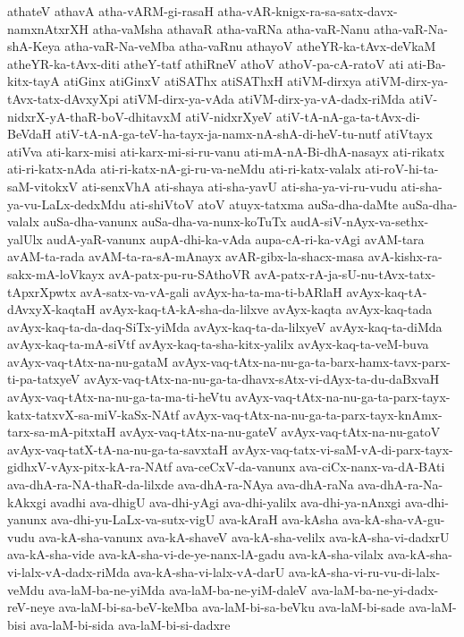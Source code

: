 {athateV
athavA
atha-vARM-gi-rasaH
atha-vAR-knigx-ra-sa-satx-davx-namxnAtxrXH
atha-vaMsha
athavaR
atha-vaRNa
atha-vaR-Nanu
atha-vaR-Na-shA-Keya
atha-vaR-Na-veMba
atha-vaRnu
athayoV
atheYR-ka-tAvx-deVkaM
atheYR-ka-tAvx-diti
atheY-tatf
athiRneV
athoV
athoV-pa-cA-ratoV
ati
ati-Ba-kitx-tayA
atiGinx
atiGinxV
atiSAThx
atiSAThxH
atiVM-dirxya
atiVM-dirx-ya-tAvx-tatx-dAvxyXpi
atiVM-dirx-ya-vAda
atiVM-dirx-ya-vA-dadx-riMda
atiV-nidxrX-yA-thaR-boV-dhitavxM
atiV-nidxrXyeV
atiV-tA-nA-ga-ta-tAvx-di-BeVdaH
atiV-tA-nA-ga-teV-ha-tayx-ja-namx-nA-shA-di-heV-tu-nutf
atiVtayx
atiVva
ati-karx-misi
ati-karx-mi-si-ru-vanu
ati-mA-nA-Bi-dhA-nasayx
ati-rikatx
ati-ri-katx-nAda
ati-ri-katx-nA-gi-ru-va-neMdu
ati-ri-katx-valalx
ati-roV-hi-ta-saM-vitokxV
ati-senxVhA
ati-shaya
ati-sha-yavU
ati-sha-ya-vi-ru-vudu
ati-sha-ya-vu-LaLx-dedxMdu
ati-shiVtoV
atoV
atuyx-tatxma
auSa-dha-daMte
auSa-dha-valalx
auSa-dha-vanunx
auSa-dha-va-nunx-koTuTx
audA-siV-nAyx-va-sethx-yalUlx
audA-yaR-vanunx
aupA-dhi-ka-vAda
aupa-cA-ri-ka-vAgi
avAM-tara
avAM-ta-rada
avAM-ta-ra-sA-mAnayx
avAR-gibx-la-shacx-masa
avA-kishx-ra-sakx-mA-loVkayx
avA-patx-pu-ru-SAthoVR
avA-patx-rA-ja-sU-nu-tAvx-tatx-tApxrXpwtx
avA-satx-va-vA-gali
avAyx-ha-ta-ma-ti-bARlaH
avAyx-kaq-tA-dAvxyX-kaqtaH
avAyx-kaq-tA-kA-sha-da-lilxve
avAyx-kaqta
avAyx-kaq-tada
avAyx-kaq-ta-da-daq-SiTx-yiMda
avAyx-kaq-ta-da-lilxyeV
avAyx-kaq-ta-diMda
avAyx-kaq-ta-mA-siVtf
avAyx-kaq-ta-sha-kitx-yalilx
avAyx-kaq-ta-veM-buva
avAyx-vaq-tAtx-na-nu-gataM
avAyx-vaq-tAtx-na-nu-ga-ta-barx-hamx-tavx-parx-ti-pa-tatxyeV
avAyx-vaq-tAtx-na-nu-ga-ta-dhavx-sAtx-vi-dAyx-ta-du-daBxvaH
avAyx-vaq-tAtx-na-nu-ga-ta-ma-ti-heVtu
avAyx-vaq-tAtx-na-nu-ga-ta-parx-tayx-katx-tatxvX-sa-miV-kaSx-NAtf
avAyx-vaq-tAtx-na-nu-ga-ta-parx-tayx-knAmx-tarx-sa-mA-pitxtaH
avAyx-vaq-tAtx-na-nu-gateV
avAyx-vaq-tAtx-na-nu-gatoV
avAyx-vaq-tatX-tA-na-nu-ga-ta-savxtaH
avAyx-vaq-tatx-vi-saM-vA-di-parx-tayx-gidhxV-vAyx-pitx-kA-ra-NAtf
ava-ceCxV-da-vanunx
ava-ciCx-nanx-va-dA-BAti
ava-dhA-ra-NA-thaR-da-lilxde
ava-dhA-ra-NAya
ava-dhA-raNa
ava-dhA-ra-Na-kAkxgi
avadhi
ava-dhigU
ava-dhi-yAgi
ava-dhi-yalilx
ava-dhi-ya-nAnxgi
ava-dhi-yanunx
ava-dhi-yu-LaLx-va-sutx-vigU
ava-kAraH
ava-kAsha
ava-kA-sha-vA-gu-vudu
ava-kA-sha-vanunx
ava-kA-shaveV
ava-kA-sha-velilx
ava-kA-sha-vi-dadxrU
ava-kA-sha-vide
ava-kA-sha-vi-de-ye-nanx-lA-gadu
ava-kA-sha-vilalx
ava-kA-sha-vi-lalx-vA-dadx-riMda
ava-kA-sha-vi-lalx-vA-darU
ava-kA-sha-vi-ru-vu-di-lalx-veMdu
ava-laM-ba-ne-yiMda
ava-laM-ba-ne-yiM-daleV
ava-laM-ba-ne-yi-dadx-reV-neye
ava-laM-bi-sa-beV-keMba
ava-laM-bi-sa-beVku
ava-laM-bi-sade
ava-laM-bisi
ava-laM-bi-sida
ava-laM-bi-si-dadxre
}
